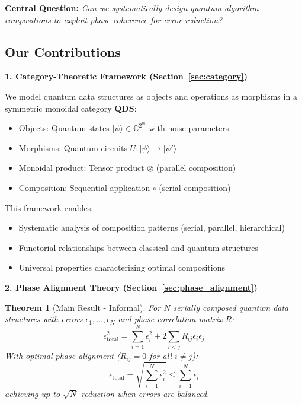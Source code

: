 \documentclass[11pt]{article}
\newtheorem{theorem}{Theorem}
\begin{document}
\textbf{Central Question:} \textit{Can we systematically design quantum algorithm compositions to exploit phase coherence for error reduction?}

\subsection{Our Contributions}

\textbf{1. Category-Theoretic Framework (Section~\ref{sec:category})}

We model quantum data structures as objects and operations as morphisms in a symmetric monoidal category $\mathbf{QDS}$:
\begin{itemize}
\item Objects: Quantum states $|\psi\rangle \in \mathbb{C}^{2^m}$ with noise parameters
\item Morphisms: Quantum circuits $U : |\psi\rangle \to |\psi'\rangle$
\item Monoidal product: Tensor product $\otimes$ (parallel composition)
\item Composition: Sequential application $\circ$ (serial composition)
\end{itemize}

This framework enables:
\begin{itemize}
\item Systematic analysis of composition patterns (serial, parallel, hierarchical)
\item Functorial relationships between classical and quantum structures
\item Universal properties characterizing optimal compositions
\end{itemize}

\textbf{2. Phase Alignment Theory (Section~\ref{sec:phase_alignment})}

\begin{theorem}[Main Result - Informal]
\label{thm:main_informal}
For $N$ serially composed quantum data structures with errors $\epsilon_1, \ldots, \epsilon_N$ and phase correlation matrix $R$:
\begin{equation}
\epsilon_{\text{total}}^2 = \sum_{i=1}^N \epsilon_i^2 + 2\sum_{i<j} R_{ij} \epsilon_i \epsilon_j
\end{equation}
With optimal phase alignment ($R_{ij} = 0$ for all $i \neq j$):
\begin{equation}
\epsilon_{\text{total}} = \sqrt{\sum_{i=1}^N \epsilon_i^2} \leq \sum_{i=1}^N \epsilon_i
\end{equation}
achieving up to $\sqrt{N}$ reduction when errors are balanced.
\end{theorem}
\end{document}
